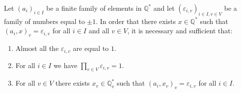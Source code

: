 Let $(a_i)_{i \in I}$ be a finite family of elements in $\mathbb{Q}^*$ and let $(\varepsilon_{i,v})_{i \in I, v \in V}$ be a family of numbers equal to $\pm 1$. In order that there exists $x \in \mathbb{Q}^*$ such that $(a_i, x)_v = \varepsilon_{i,v}$ for all $i \in I$ and all $v \in V$, it is necessary and sufficient that:
\begin{enumerate}
\item[(1)] Almost all the $\varepsilon_{i,v}$ are equal to $1$.
\item[(2)] For all $i \in I$ we have $\prod_{v \in V} \varepsilon_{i,v} = 1$.
\item[(3)] For all $v \in V$ there exists $x_v \in \mathbb{Q}_v^*$ such that $(a_i, x_v)_v = \varepsilon_{i,v}$ for all $i \in I$.
\end{enumerate}
